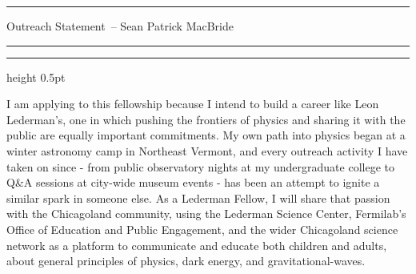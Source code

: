\documentclass[11pt]{article}
\newcommand{\yourname}{Sean Patrick MacBride}
\newcommand{\soptitle}{Outreach Statement}
\begin{document}
\hrule
\begin{center}
    \Large\soptitle\ -- \yourname
\end{center}
\vspace{0pt}
\hrule
\vspace{0.5pt}
\hrule height 0.5pt
\vspace{3pt}
\thispagestyle{plain}

\normalsize
\noindent
I am applying to this fellowship because I intend to build a career like Leon Lederman’s, one in which pushing the frontiers of physics and sharing it with the public are equally important commitments.
My own path into physics began at a winter astronomy camp in Northeast Vermont, and every outreach activity I have taken on since - from public observatory nights at my undergraduate college to Q\&A sessions at city-wide museum events - has been an attempt to ignite a similar spark in someone else. 
As a Lederman Fellow, I will share that passion with the Chicagoland community, using the Lederman Science Center, Fermilab's Office of Education and Public Engagement, and the wider Chicagoland science network as a platform to communicate and educate both children and adults, about general principles of physics, dark energy, and gravitational-waves.
\end{document}
